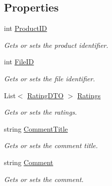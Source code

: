 \subsection*{Properties}
\begin{DoxyCompactItemize}
\item 
int \hyperlink{class_open_1_1_g_i_1_1hypermart_1_1_data_transformation_objects_1_1_rating_information_d_t_o_a61901005559d6c38ab603a05bda5e7dc}{Product\+ID}
\begin{DoxyCompactList}\small\item\em Gets or sets the product identifier. \end{DoxyCompactList}\item 
int \hyperlink{class_open_1_1_g_i_1_1hypermart_1_1_data_transformation_objects_1_1_rating_information_d_t_o_a001e521dcdd218fa57dfc4b664db83ff}{File\+ID}
\begin{DoxyCompactList}\small\item\em Gets or sets the file identifier. \end{DoxyCompactList}\item 
List$<$ \hyperlink{class_open_1_1_g_i_1_1hypermart_1_1_data_transformation_objects_1_1_rating_d_t_o}{Rating\+D\+TO} $>$ \hyperlink{class_open_1_1_g_i_1_1hypermart_1_1_data_transformation_objects_1_1_rating_information_d_t_o_a1783df6144c56bb196b7cd0237a1ac00}{Ratings}
\begin{DoxyCompactList}\small\item\em Gets or sets the ratings. \end{DoxyCompactList}\item 
string \hyperlink{class_open_1_1_g_i_1_1hypermart_1_1_data_transformation_objects_1_1_rating_information_d_t_o_aa7dbcf1f467890a811b458b76c68e7f5}{Comment\+Title}
\begin{DoxyCompactList}\small\item\em Gets or sets the comment title. \end{DoxyCompactList}\item 
string \hyperlink{class_open_1_1_g_i_1_1hypermart_1_1_data_transformation_objects_1_1_rating_information_d_t_o_a75cc38ad71428e87e97db4d9c1deb672}{Comment}
\begin{DoxyCompactList}\small\item\em Gets or sets the comment. \end{DoxyCompactList}\end{DoxyCompactItemize}



